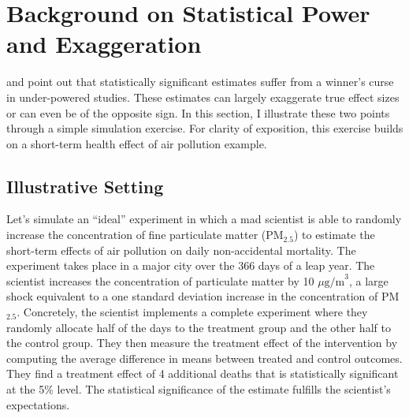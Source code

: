 \documentclass[12pt]{article}
\begin{document}



\section{Background on Statistical Power and Exaggeration}\label{section_mad_scientist}

    \cite{gelman_type_2000} and \cite{gelman_beyond_2014} point out that statistically significant estimates suffer from a winner's curse in under-powered studies. These estimates can largely exaggerate true effect sizes or can even be of the opposite sign. In this section, I illustrate these two points through a simple simulation exercise. For clarity of exposition, this exercise builds on a short-term health effect of air pollution example.%

    \subsection{Illustrative Setting}

    Let's simulate an ``ideal'' experiment in which a mad scientist is able to randomly increase the concentration of fine particulate matter (PM$_{2.5}$) to estimate the short-term effects of air pollution on daily non-accidental mortality. The experiment takes place in a major city over the 366 days of a leap year. The scientist increases the concentration of particulate matter by 10 $\mu \text{g/m}^3$, a large shock equivalent to a one standard deviation increase in the concentration of PM$_{2.5}$. Concretely, the scientist implements a complete experiment where they randomly allocate half of the days to the treatment group and the other half to the control group. They then measure the treatment effect of the intervention by computing the average difference in means between treated and control outcomes. They find a treatment effect of 4 additional deaths that is statistically significant at the 5\% level. The statistical significance of the estimate fulfills the scientist's expectations.
\end{document}
